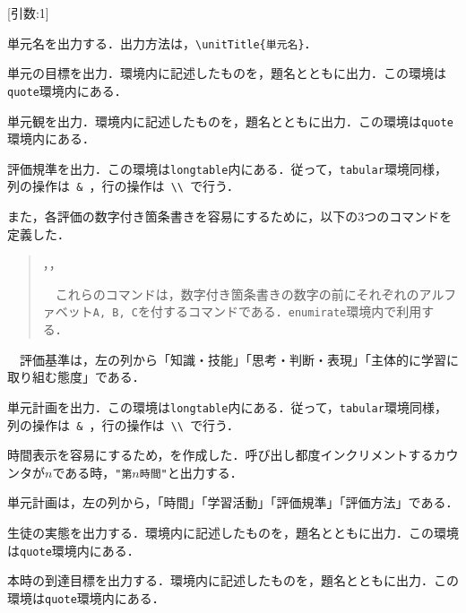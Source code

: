 \documentclass[paper=a4,fontsize=10.5pt]{jlreq}
\begin{document}
\noindent\ovalbox{\verb|\unitTitle|} [引数:1]\par
単元名を出力する．出力方法は，\verb|\unitTitle{単元名}|．\\
\noindent{}\par
単元の目標を出力．環境内に記述したものを，題名とともに出力．この環境は\verb|quote|環境内にある．\\
\par
単元観を出力．環境内に記述したものを，題名とともに出力．この環境は\verb|quote|環境内にある．\\
\par
評価規準を出力．この環境は\verb|longtable|内にある．従って，\verb|tabular|環境同様，列の操作は\verb| & |，行の操作は\verb| \\ |で行う．\par
また，各評価の数字付き箇条書きを容易にするために，以下の3つのコマンドを定義した．
\begin{quote}
    \noindent\ovalbox{\verb|\enumiA|}，\ovalbox{\verb|\enumiB|}，\ovalbox{\verb|\enumiC|}\par
    \ \ これらのコマンドは，数字付き箇条書きの数字の前にそれぞれのアルファベット\verb|A, B, C|を付するコマンドである．\verb|enumirate|環境内で利用する．
\end{quote}
\ \ 評価基準は，左の列から「知識・技能」「思考・判断・表現」「主体的に学習に取り組む態度」である．\\
\par
単元計画を出力．この環境は\verb|longtable|内にある．従って，\verb|tabular|環境同様，列の操作は\verb| & |，行の操作は\verb| \\ |で行う．\par
時間表示を容易にするため，\ovalbox{\verb|\timeCount|}を作成した．呼び出し都度インクリメントするカウンタが\(n\)である時，\verb|"第|\(n\)\verb|時間"|と出力する．\par
単元計画は，左の列から，「時間」「学習活動」「評価規準」「評価方法」である．\\
\par
生徒の実態を出力する．環境内に記述したものを，題名とともに出力．この環境は\verb|quote|環境内にある．\\
\par
本時の到達目標を出力する．環境内に記述したものを，題名とともに出力．この環境は\verb|quote|環境内にある．\\
\end{document}
